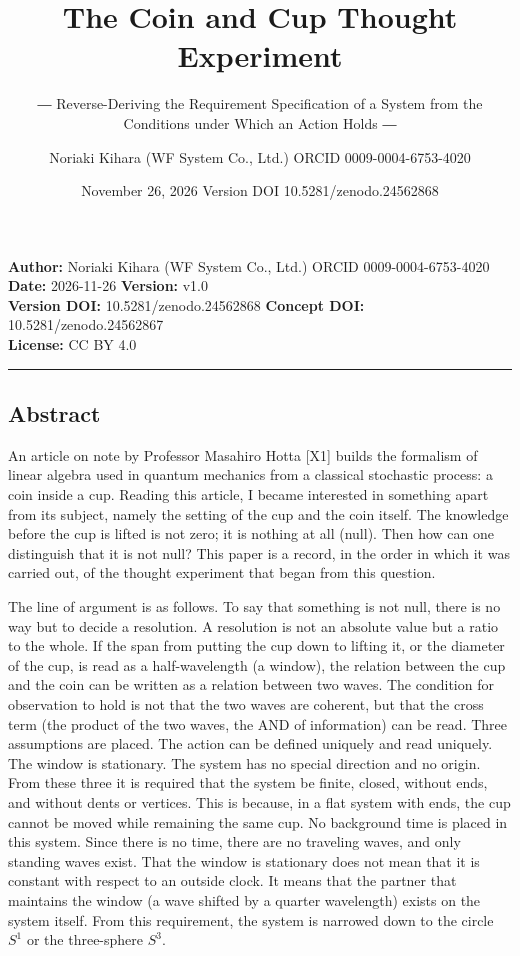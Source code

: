 \documentclass[
  a4paper,
]{article}
\title{The Coin and Cup Thought Experiment}
\subtitle{― Reverse-Deriving the Requirement Specification of a System
from the Conditions under Which an Action Holds ―}
\author{Noriaki Kihara (WF System Co., Ltd.) ORCID 0009-0004-6753-4020}
\date{November 26, 2026 Version DOI 10.5281/zenodo.24562868}
\begin{document}
\maketitle

\textbf{Author:} Noriaki Kihara (WF System Co., Ltd.) ORCID
0009-0004-6753-4020\\
\textbf{Date:} 2026-11-26 \textbf{Version:} v1.0\\
\textbf{Version DOI:} 10.5281/zenodo.24562868 \textbf{Concept DOI:}
10.5281/zenodo.24562867\\
\textbf{License:} CC BY 4.0

\begin{center}\rule{0.5\linewidth}{0.5pt}\end{center}

\subsection{Abstract}\label{abstract}

An article on note by Professor Masahiro Hotta {[}X1{]} builds the
formalism of linear algebra used in quantum mechanics from a classical
stochastic process: a coin inside a cup. Reading this article, I became
interested in something apart from its subject, namely the setting of
the cup and the coin itself. The knowledge before the cup is lifted is
not zero; it is nothing at all (null). Then how can one distinguish that
it is not null? This paper is a record, in the order in which it was
carried out, of the thought experiment that began from this question.

The line of argument is as follows. To say that something is not null,
there is no way but to decide a resolution. A resolution is not an
absolute value but a ratio to the whole. If the span from putting the
cup down to lifting it, or the diameter of the cup, is read as a
half-wavelength (a window), the relation between the cup and the coin
can be written as a relation between two waves. The condition for
observation to hold is not that the two waves are coherent, but that the
cross term (the product of the two waves, the AND of information) can be
read. Three assumptions are placed. The action can be defined uniquely
and read uniquely. The window is stationary. The system has no special
direction and no origin. From these three it is required that the system
be finite, closed, without ends, and without dents or vertices. This is
because, in a flat system with ends, the cup cannot be moved while
remaining the same cup. No background time is placed in this system.
Since there is no time, there are no traveling waves, and only standing
waves exist. That the window is stationary does not mean that it is
constant with respect to an outside clock. It means that the partner
that maintains the window (a wave shifted by a quarter wavelength)
exists on the system itself. From this requirement, the system is
narrowed down to the circle \(S^1\) or the three-sphere \(S^3\).
\end{document}
